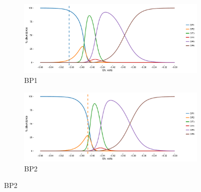 \singlespace
\begin{figure}[h]
\centering

    \begin{subfigure}[b]{\linewidth}
      	\includegraphics[width=1\linewidth]{"figs_ch2/Bison OF1_thermo"}
      	\caption{BP1}
        \label{fig:BP1_thermo}
    \end{subfigure}
    \begin{subfigure}[b]{\linewidth}
    	\includegraphics[width=1\linewidth]{"figs_ch2/Bison OF2_thermo"}
    	\caption{BP2}
        \label{fig:BP2_thermo}
    \end{subfigure}
    
\end{figure}

\newpage

